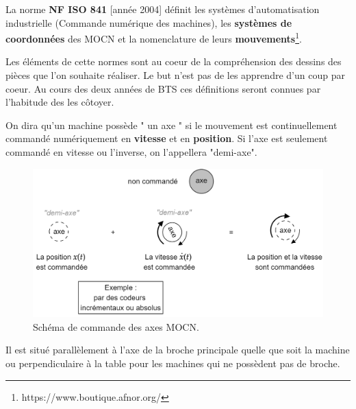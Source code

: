 \documentclass[
	11pt, %
	fleqn, %
	a4paper, %
]{LegrandOrangeBook}
\begin{document}
\begin{definition}
   La norme \textbf{NF ISO 841} [année 2004] définit les systèmes d'automatisation industrielle (Commande numérique des machines), les\textbf{ systèmes de coordonnées} des MOCN et la nomenclature de leurs \textbf{mouvements}\footnote{https://www.boutique.afnor.org/}.
\end{definition}




Les éléments de cette normes sont au coeur de la compréhension des dessins des pièces que l'on souhaite réaliser. Le but n'est pas de les apprendre d'un coup par coeur. Au cours des deux années de BTS ces définitions seront connues par l'habitude des les côtoyer.\\



\begin{definition}[Axes]
    On dira qu'un machine possède " un axe " si le mouvement est continuellement commandé numériquement en \textbf{vitesse} et en \textbf{position}. Si l'axe est seulement commandé en vitesse ou l'inverse, on l'appellera "demi-axe".
\end{definition}


\begin{figure}[h] %
	\centering %
	\includegraphics[width=1\textwidth]{Images/C1.png} %
	\caption{Schéma de commande des axes MOCN.}
	\label{logo_C1} %
\end{figure}


\begin{definition}
    Il est situé parallèlement à l’axe de la broche principale quelle que soit la machine ou perpendiculaire à la table pour les machines qui ne possèdent pas de broche.
\end{definition}
\end{document}
